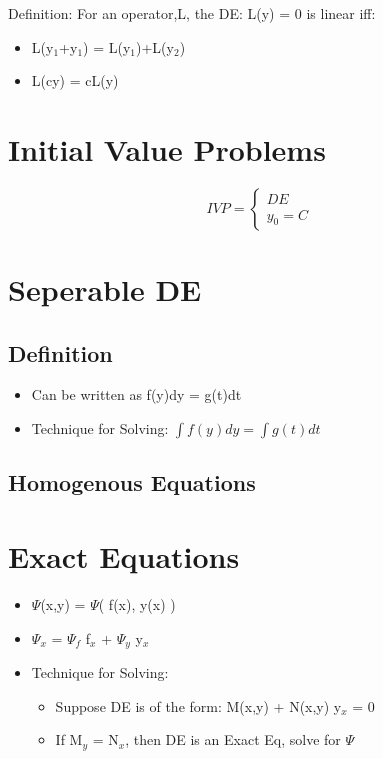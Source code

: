 \documentclass[11pt]{article}
\begin{document}
  Definition: For an operator,L, the DE: L(y) = 0 is linear iff:
\begin{itemize}
\item L(y$_1$+y$_1$) = L(y$_1$)+L(y$_2$)
\item L(cy) = cL(y)
\end{itemize}
\section{Initial Value Problems}
\label{sec-4}

  \begin{displaymath}
  IVP = \left \{
  \begin{array}{lr}
  DE\\
  y_0 = C
  \end{array}
  \right.
  \end{displaymath}

\section{Seperable DE}
\label{sec-5}

\subsection{Definition}
\label{sec-5.1}

\begin{itemize}
\item Can be written as f(y)dy = g(t)dt
\item Technique for Solving: $\int f(y)dy = \int g(t)dt$
\end{itemize}
\subsection{Homogenous Equations}
\label{sec-5.2}

\section{Exact Equations}
\label{sec-6}

\begin{itemize}
\item $\Psi$(x,y) = $\Psi$( f(x), y(x) )
\item $\Psi$$_x$ = $\Psi$$_f$ f$_x$ + $\Psi$$_y$ y$_x$
\item Technique for Solving:

\begin{itemize}
\item Suppose DE is of the form: M(x,y) + N(x,y) y$_x$ = 0
\item If M$_y$ = N$_x$, then DE is an Exact Eq, solve for $\Psi$
\end{itemize}

\end{itemize}
\end{document}
